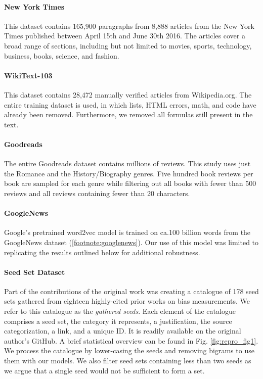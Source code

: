 \paragraph{New York Times} This dataset contains 165,900 paragraphs from 8,888 articles from the New
York Times published between April 15th and June 30th 2016. The articles cover a broad range of
sections, including but not limited to movies, sports, technology, business, books, science, and
fashion.

\paragraph{WikiText-103} This dataset contains 28,472 manually verified articles from Wikipedia.org.
The entire training dataset is used, in which lists, HTML errors, math, and code have already been
removed. Furthermore, we removed all formulas still present in the text.

\paragraph{Goodreads} The entire Goodreads dataset contains millions of reviews. This study uses
just the Romance and the History/Biography genres. Five hundred book reviews per book are sampled
for each genre while filtering out all books with fewer than 500 reviews and all reviews containing
fewer than 20 characters.

\paragraph{GoogleNews} Google's pretrained word2vec model is trained on ca.100 billion words from
the GoogleNews dataset (\ref{footnote:googlenews}). Our use of this model was limited to replicating
the results outlined below for additional robustness.

\paragraph{Seed Set Dataset} Part of the contributions of the original work was creating a catalogue
of 178 seed sets gathered from eighteen highly-cited prior works on bias measurements. We refer to
this catalogue as the \emph{gathered seeds}. Each element of the catalogue comprises a seed set, the
category it represents, a justification, the source categorization, a link, and a unique ID. It is
readily available on the original author's GitHub. A brief
statistical overview can be found in Fig. \ref{fig:repro_fig1}. We process the catalogue by
lower-casing the seeds and removing bigrams to use them with our models. We also filter seed sets
containing less than two seeds as we argue that a single seed would not be sufficient to form a set.

